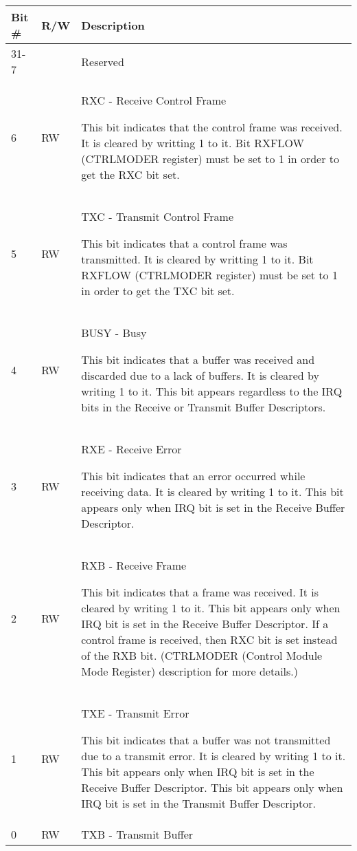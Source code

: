 \begin{table}[H]
  \centering
  \begin{tabularx}{\textwidth}{|l|l|X|}
    
    \hline
    \rowcolor{iob-green}
    {\bf Bit \#} & {\bf R/W} & {\bf Description} \\ \hline

    31-7   &   & Reserved \\ \hline
    \rowcolor{iob-blue}
    6      & RW & RXC - Receive Control Frame

                This bit indicates that the control frame was received. It is
                cleared by writting 1 to it. Bit RXFLOW (CTRLMODER register)
                must be set to 1 in order to get the RXC bit set. \\ \hline
    5      & RW & TXC - Transmit Control Frame

                This bit indicates that a control frame was transmitted. It is
                cleared by writting 1 to it. Bit RXFLOW (CTRLMODER register)
                must be set to 1 in order to get the TXC bit set. \\ \hline
    \rowcolor{iob-blue}
    4      & RW & BUSY - Busy

                This bit indicates that a buffer was received and discarded due
                to a lack of buffers. It is cleared by writing 1 to it. This
                bit appears regardless to the IRQ bits in the Receive or
                Transmit Buffer Descriptors.\\ \hline
    3      & RW & RXE - Receive Error

                This bit indicates that an error occurred while receiving data.
                It is cleared by writing 1 to it. This bit appears only when
                IRQ bit is set in the Receive Buffer Descriptor.\\ \hline
    \rowcolor{iob-blue}
    2      & RW & RXB - Receive Frame

                This bit indicates that a frame was received. It is cleared by
                writing 1 to it. This bit appears only when IRQ bit is set in
                the Receive Buffer Descriptor. If a control frame is received,
                then RXC bit is set instead of the RXB bit. (CTRLMODER (Control
                Module Mode Register) description for more details.)\\
                \hline
    1      & RW & TXE - Transmit Error

                This bit indicates that a buffer was not transmitted due to a
                transmit error. It is cleared by writing 1 to it. This bit
                appears only when IRQ bit is set in the Receive Buffer
                Descriptor. This bit appears only when IRQ bit is set in the
                Transmit Buffer Descriptor.\\ \hline
    \rowcolor{iob-blue}
    0      & RW & TXB - Transmit Buffer


\end{tabularx}
\end{table}
